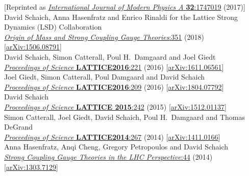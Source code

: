 \begin{spacelist}
\begin{revnumerate}
      {[Reprinted as \href{http://dx.doi.org/10.1142/S0217751X17470194}{\textit{International Journal of Modern Physics A} \textbf{32}:1747019} (2017)]}
    \pagebreakitem
       \\
      David Schaich, Anna Hasenfratz and Enrico Rinaldi for the Lattice Strong Dynamics (LSD) Collaboration \\
      \href{http://dx.doi.org/10.1142/9789813231467_0051}{\textit{Origin of Mass and Strong Coupling Gauge Theories}:351} (2018) [\href{http://arxiv.org/abs/1506.08791}{arXiv:1506.08791}]
    \pagebreakitem
       \\
      David Schaich, Simon Catterall, Poul H.~Damgaard and Joel Giedt \\
      \href{https://doi.org/10.22323/1.256.0221}{\textit{Proceedings of Science} \textbf{LATTICE2016}:221} (2016) [\href{http://arxiv.org/abs/1611.06561}{arXiv:1611.06561}]
    \pagebreakitem
       \\
      Joel Giedt, Simon Catterall, Poul Damgaard and David Schaich \\
      \href{https://doi.org/10.22323/1.256.0209}{\textit{Proceedings of Science} \textbf{LATTICE2016}:209} (2016) [\href{http://arxiv.org/abs/1804.07792}{arXiv:1804.07792}]
    \pagebreakitem
       \\
      David Schaich \\
      \href{https://doi.org/10.22323/1.251.0242}{\textit{Proceedings of Science} \textbf{LATTICE 2015}:242} (2015) [\href{http://arxiv.org/abs/1512.01137}{arXiv:1512.01137}]
    \pagebreakitem
       \\
      Simon Catterall, Joel Giedt, David Schaich, Poul H.~Damgaard and Thomas DeGrand \\
      \href{https://doi.org/10.22323/1.214.0267}{\textit{Proceedings of Science} \textbf{LATTICE2014}:267} (2014) [\href{http://arxiv.org/abs/1411.0166}{arXiv:1411.0166}]
    \pagebreakitem
       \\
      Anna Hasenfratz, Anqi Cheng, Gregory Petropoulos and David Schaich \\
      \href{http://dx.doi.org/10.1142/9789814566254_0004}{\textit{Strong Coupling Gauge Theories in the LHC Perspective}:44} (2014) [\href{http://arxiv.org/abs/1303.7129}{arXiv:1303.7129}]

\end{revnumerate}
\end{spacelist}
